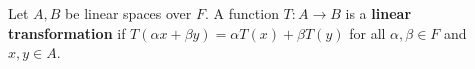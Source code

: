 Let $A, B$ be linear spaces over $F$. A function $T : A \to B$ is a \textbf{linear transformation} if $T(\alpha x + \beta y) = \alpha T(x) + \beta T(y)$ for all $\alpha, \beta \in F$ and $x, y \in A$.
